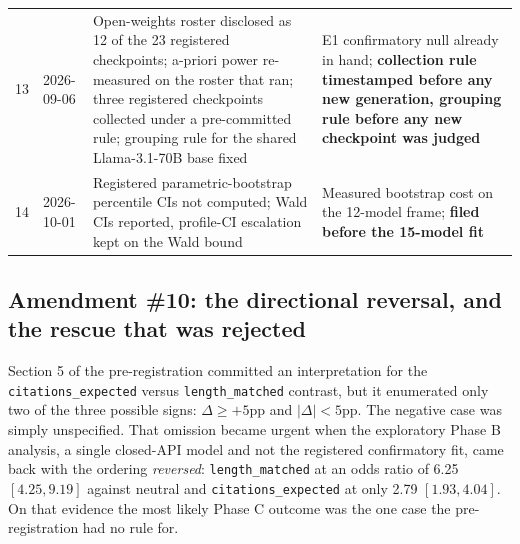 \begin{table}[htbp]
\begin{tabular}{@{}r l p{} p{}@{}}
13 & 2026-09-06 & Open-weights roster disclosed as 12 of the 23 registered checkpoints; a-priori power re-measured on the roster that ran; three registered checkpoints collected under a pre-committed rule; grouping rule for the shared Llama-3.1-70B base fixed & E1 confirmatory null already in hand; \textbf{collection rule timestamped before any new generation, grouping rule before any new checkpoint was judged} \\
14 & 2026-10-01 & Registered parametric-bootstrap percentile CIs not computed; Wald CIs reported, profile-CI escalation kept on the Wald bound & Measured bootstrap cost on the 12-model frame; \textbf{filed before the 15-model fit} \\
\bottomrule
\end{tabular}
\end{table}

\subsection{Amendment \#10: the directional reversal, and the rescue that was rejected}

Section 5 of the pre-registration committed an interpretation for the
\texttt{citations\_expected} versus \texttt{length\_matched} contrast, but it
enumerated only two of the three possible signs: $\Delta \geq +5$pp and
$|\Delta| < 5$pp. The negative case was simply unspecified. That omission became
urgent when the exploratory Phase B analysis, a single closed-API model and not
the registered confirmatory fit, came back with the ordering \emph{reversed}:
\texttt{length\_matched} at an odds ratio of 6.25 $[4.25, 9.19]$ against neutral
and \texttt{citations\_expected} at only 2.79 $[1.93, 4.04]$. On that evidence
the most likely Phase C outcome was the one case the pre-registration had no
rule for.

